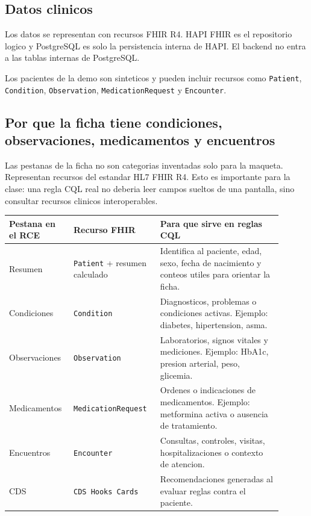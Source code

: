 \subsection{Datos clinicos}

Los datos se representan con recursos FHIR R4. HAPI FHIR es el repositorio
logico y PostgreSQL es solo la persistencia interna de HAPI. El backend no entra
a las tablas internas de PostgreSQL.

Los pacientes de la demo son sinteticos y pueden incluir recursos como
\texttt{Patient}, \texttt{Condition}, \texttt{Observation}, \texttt{MedicationRequest}
y \texttt{Encounter}.

\subsection{Por que la ficha tiene condiciones, observaciones, medicamentos y encuentros}

Las pestanas de la ficha no son categorias inventadas solo para la maqueta.
Representan recursos del estandar HL7 FHIR R4. Esto es importante para la clase:
una regla CQL real no deberia leer campos sueltos de una pantalla, sino consultar
recursos clinicos interoperables.

\begin{longtable}{p{0.20\linewidth}p{0.28\linewidth}p{0.42\linewidth}}
\toprule
Pestana en el RCE & Recurso FHIR & Para que sirve en reglas CQL \\
\midrule
Resumen & \texttt{Patient} + resumen calculado & Identifica al paciente, edad, sexo, fecha de nacimiento y conteos utiles para orientar la ficha. \\
Condiciones & \texttt{Condition} & Diagnosticos, problemas o condiciones activas. Ejemplo: diabetes, hipertension, asma. \\
Observaciones & \texttt{Observation} & Laboratorios, signos vitales y mediciones. Ejemplo: HbA1c, presion arterial, peso, glicemia. \\
Medicamentos & \texttt{MedicationRequest} & Ordenes o indicaciones de medicamentos. Ejemplo: metformina activa o ausencia de tratamiento. \\
Encuentros & \texttt{Encounter} & Consultas, controles, visitas, hospitalizaciones o contexto de atencion. \\
CDS & \texttt{CDS Hooks Cards} & Recomendaciones generadas al evaluar reglas contra el paciente. \\
\bottomrule
\end{longtable}

